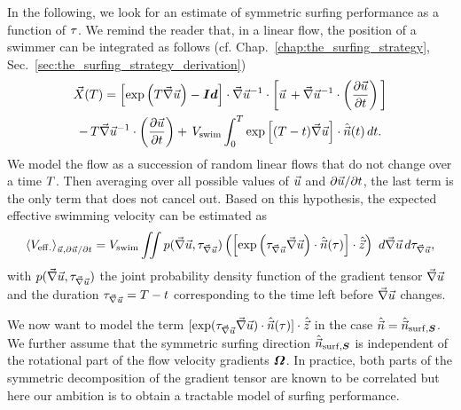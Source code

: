 In the following, we look for an estimate of symmetric surfing performance as a function of $\tau$.
We remind the reader that, in a linear flow, the position of a swimmer can be integrated as follows (cf. Chap.~\ref{chap:the_surfing_strategy}, Sec.~\ref{sec:the_surfing_strategy_derivation})
\begin{multline}
	\vec{X}(T) =
	\left[ \exp \left( T \vec{\nabla} \vec{u} \right) - \boldsymbol{Id} \right] \cdot \vec{\nabla} \vec{u}^{-1} \cdot \left[ \vec{u} \, + \vec{\nabla} \vec{u}^{-1} \cdot \left(\frac{\partial \vec{u}}{\partial t} \right) \, \right] \\
	- \, T \vec{\nabla} \vec{u}^{-1} \cdot \left(\frac{\partial \vec{u}}{\partial t} \right)
	+ \, V_{\mathrm{swim}} \int_{0}^{T} \exp \left[ (T - t) \vec{\nabla} \vec{u} \right] \cdot\hat{\vec{n}}(t) \, dt.
\end{multline}
We model the flow as a succession of random linear flows that do not change over a time $T$.
Then averaging over all possible values of $\vec{u}$ and $\partial \vec{u} / \partial t$, the last term is the only term that does not cancel out.
Based on this hypothesis, the expected effective swimming velocity can be estimated as
\begin{equation}\label{turb:eq:performance}
	\left\langle V_{\mathrm{eff.}} \right\rangle_{\vec{u}, \partial \vec{u} / \partial t} = V_{\mathrm{swim}} \iint p(\vec{\nabla} \vec{u}, \tau_{\vec{\nabla} \vec{u}}) \left( \left[ \exp \left( \tau_{\vec{\nabla} \vec{u}} \vec{\nabla} \vec{u} \right) \cdot \hat{\vec{n}}(\tau) \right] \cdot \hat{\vec{z}} \right) \,\, d \vec{\nabla} \vec{u} \, d \tau_{\vec{\nabla} \vec{u}},
\end{equation}
with $p(\vec{\nabla} \vec{u}, \tau_{\vec{\nabla} \vec{u}})$ the joint probability density function of the gradient tensor $\vec{\nabla} \vec{u}$ and the duration $\tau_{\vec{\nabla} \vec{u}} = T - t$ corresponding to the time left before $\vec{\nabla} \vec{u}$ changes.

We now want to model the term $[ \exp ( \tau_{\vec{\nabla} \vec{u}} \vec{\nabla} \vec{u} ) \cdot \hat{\vec{n}}(\tau) ] \cdot \hat{\vec{z}}$ in the case $\hat{\vec{n}} = \hat{\vec{n}}_{\mathrm{surf}, \boldsymbol{S}}$.
We further assume that the symmetric surfing direction $\hat{\vec{n}}_{\mathrm{surf}, \boldsymbol{S}}$ is independent of the rotational part of the flow velocity gradients $\boldsymbol{\varOmega}$.
In practice, both parts of the symmetric decomposition of the gradient tensor are known to be correlated \citep{buaria2022vorticity} but here our ambition is to obtain a tractable model of surfing performance.

